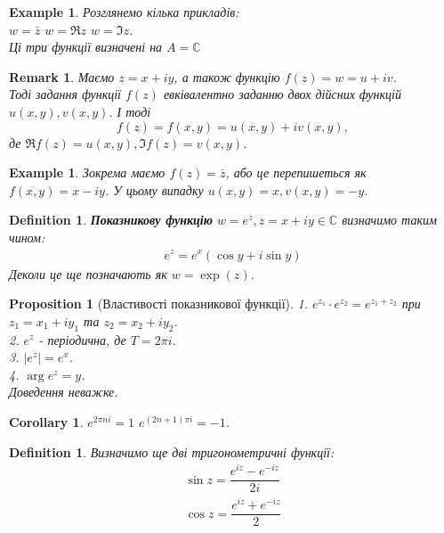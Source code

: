 \documentclass[a4paper, 10pt]{article}
\theoremstyle{theoremdd}
\theoremstyle{theoremdd}
\newtheorem{definition}[theorem]{Definition}
\theoremstyle{theoremdd}
\theoremstyle{theoremdd}
\newtheorem{example}[theorem]{Example}
\theoremstyle{theoremdd}
\newtheorem{proposition}[theorem]{Proposition}
\theoremstyle{theoremdd}
\newtheorem{remark}[theorem]{Remark}
\theoremstyle{theoremdd}
\theoremstyle{theoremdd}
\newtheorem{corollary}[theorem]{Corollary}
\begin{document}
\begin{example}
Розглянемо кілька прикладів:\\
$w = \bar{z}$ \hspace{1cm} $w = \Re z$ \hspace{1cm} $w = \Im z$.\\
Ці три функції визначені на $A = \mathbb{C}$
\end{example}

\begin{remark}
Маємо $z = x+iy$, а також функцію $f(z) = w = u + iv$.\\
Тоді задання функції $f(z)$ евківалентно заданню двох дійсних функцій $u(x,y),v(x,y)$. І тоді
$$ f(z) = f(x,y) = u(x,y) + iv(x,y),$$
де $\Re f(z) = u(x,y), \Im f(z) = v(x,y)$.
\end{remark}

\begin{example}
Зокрема маємо $f(z) = \bar{z}$, або це перепишеться як\\
$f(x,y) = x - iy$. У цьому випадку $u(x,y) = x, v(x,y) = -y$.
\end{example}

\begin{definition}
\textbf{Показникову функцію} $w = e^z, z = x + iy \in \mathbb{C}$ визначимо таким чином:
\begin{align*}
e^z = e^x(\cos y + i \sin y)
\end{align*}
Деколи це ще позначають як $w = \exp(z)$.
\end{definition}

\begin{proposition}[Властивості показникової функції]
1. $e^{z_1} \cdot e^{z_2} = e^{z_1+z_2}$ при $z_1 = x_1+iy_1$ та $z_2 = x_2+iy_2$.\\
2. $e^z$ - періодична, де $T = 2\pi i$.\\
3. $|e^z| = e^x$.\\
4. $\arg e^z = y$.\\
\textit{Доведення неважке.}
\end{proposition}

\begin{corollary}
$e^{2\pi n i} = 1$ \hspace{1cm} $e^{(2n+1)\pi i} = -1$.
\end{corollary}

\begin{definition}
Визначимо ще дві тригонометричні функції:
\begin{align*}
\sin z = \dfrac{e^{iz} - e^{-iz}}{2i} \\
\cos z = \dfrac{e^{iz} + e^{-iz}}{2}
\end{align*}
\end{definition}
\end{document}
